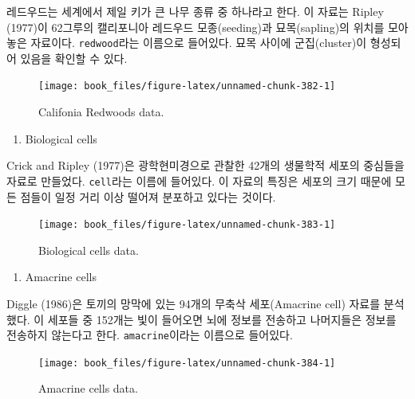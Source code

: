 \documentclass[b5paper,]{scrbook}
\providecommand{\tightlist}{%
  \setlength{\itemsep}{0pt}\setlength{\parskip}{0pt}}
\theoremstyle{plain}
\theoremstyle{definition}
\numberwithin{equation}{section}
\begin{document}
레드우드는 세계에서 제일 키가 큰 나무 종류 중 하나라고 한다. 이 자료는 Ripley (1977)이 62그루의 캘리포니아 레드우드 모종(seeding)과 묘목(sapling)의 위치를 모아놓은 자료이다. \texttt{redwood}라는 이름으로 들어있다. 묘목 사이에 군집(cluster)이 형성되어 있음을 확인할 수 있다.

\begin{figure}

{\centering \texttt{[image: book\_files/figure-latex/unnamed-chunk-382-1]} 

}

\caption{Califonia Redwoods data.}\label{fig:unnamed-chunk-382}
\end{figure}

\begin{enumerate}
\def\labelenumi{\arabic{enumi}.}
\setcounter{enumi}{2}
\tightlist
\item
  Biological cells
\end{enumerate}

Crick and Ripley (1977)은 광학현미경으로 관찰한 42개의 생물학적 세포의 중심들을 자료로 만들었다. \texttt{cell}라는 이름에 들어있다. 이 자료의 특징은 세포의 크기 때문에 모든 점들이 일정 거리 이상 떨어져 분포하고 있다는 것이다.

\begin{figure}

{\centering \texttt{[image: book\_files/figure-latex/unnamed-chunk-383-1]} 

}

\caption{Biological cells data.}\label{fig:unnamed-chunk-383}
\end{figure}

\begin{enumerate}
\def\labelenumi{\arabic{enumi}.}
\setcounter{enumi}{3}
\tightlist
\item
  Amacrine cells
\end{enumerate}

Diggle (1986)은 토끼의 망막에 있는 94개의 무축삭 세포(Amacrine cell) 자료를 분석했다. 이 세포들 중 152개는 빛이 들어오면 뇌에 정보를 전송하고 나머지들은 정보를 전송하지 않는다고 한다. \texttt{amacrine}이라는 이름으로 들어있다.

\begin{figure}

{\centering \texttt{[image: book\_files/figure-latex/unnamed-chunk-384-1]} 

}

\caption{Amacrine cells data.}\label{fig:unnamed-chunk-384}
\end{figure}
\end{document}
